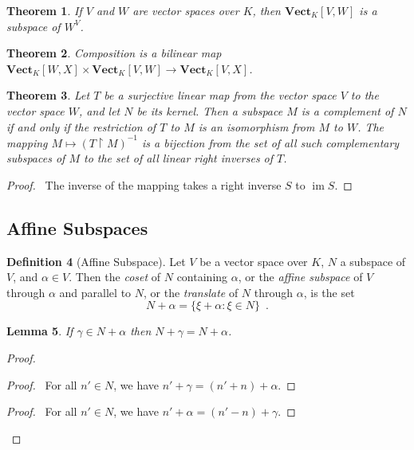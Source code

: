 \documentclass{book}
\let\qed\relax
\newtheorem{lm}{Lemma}[chapter]
\newtheorem{thm}[lm]{Theorem}
\theoremstyle{definition}
\newtheorem{df}[lm]{Definition}
\newcommand{\inv}[1]{\ensuremath{{#1}^{-1}}}
\newcommand{\im}{\ensuremath{\operatorname{im}}}
\begin{document}
  \begin{thm}
    If $V$ and $W$ are vector spaces over $K$, then $\mathbf{Vect}_K[V, W]$ is 
    a 
    subspace of $W^V$.
  \end{thm}
  
  \begin{thm}
    Composition is a bilinear map $\mathbf{Vect}_K[W, X] \times 
    \mathbf{Vect}_K[V, W] \rightarrow \mathbf{Vect}_K[V, X]$.
  \end{thm}
  
  \begin{thm}
    Let $T$ be a surjective linear map from the vector space $V$ to the vector 
    space $W$, and let $N$ be its kernel. Then a subspace $M$ is a complement 
    of $N$ if and only if the restriction of $T$ to $M$ is an isomorphism from 
    $M$ to $W$. The mapping $M \mapsto \inv{(T \restriction M)}$ is a bijection 
    from the set of all such complementary subspaces of $M$ to the set of all 
    linear right inverses of $T$.
  \end{thm}
  
  \begin{proof}
    \pf\ 
    The inverse of the mapping takes a right inverse $S$ to $\im S$. \qed
  \end{proof}
  
  
  \subsection{Affine Subspaces}
  
  \begin{df}[Affine Subspace]
    Let $V$ be a vector space over $K$, $N$ a subspace of $V$, and $\alpha \in 
    V$.
    Then the \emph{coset} of $N$ containing $\alpha$, or the \emph{affine 
      subspace} of $V$ through $\alpha$ and parallel to $N$, or the 
    \emph{translate} of $N$ through $\alpha$, is the set
    \[ N + \alpha = \{ \xi + \alpha : \xi \in N \} \enspace . \]
  \end{df}
  
  \begin{lm}
    \label{lm:linear:affine:coset}
    If $\gamma \in N + \alpha$ then $N + \gamma = N + \alpha$.
  \end{lm}
  
  \begin{proof}
    \pf
    \begin{proof}
      \pf\ For all $n' \in N$, we have $n' + \gamma = (n' + n) + \alpha$.
    \end{proof}
    \begin{proof}
      \pf\ For all $n' \in N$, we have $n' + \alpha = (n' - n) + \gamma$.
    \end{proof}
    \qed
  \end{proof}
  
\end{document}
